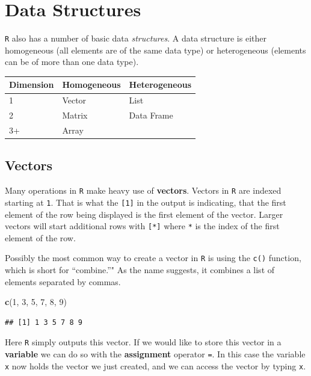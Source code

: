 \documentclass[]{book}
\newenvironment{Shaded}{\begin{snugshade}}{\end{snugshade}}
\newcommand{\KeywordTok}[1]{\textcolor[rgb]{0.13,0.29,0.53}{\textbf{#1}}}
\newcommand{\DecValTok}[1]{\textcolor[rgb]{0.00,0.00,0.81}{#1}}
\newcommand{\NormalTok}[1]{#1}
\theoremstyle{definition}
\theoremstyle{definition}
\theoremstyle{definition}
\theoremstyle{remark}
\begin{document}
\section{Data Structures}\label{data-structures}

\texttt{R} also has a number of basic data \emph{structures}. A data
structure is either homogeneous (all elements are of the same data type)
or heterogeneous (elements can be of more than one data type).

\begin{longtable}[]{@{}lll@{}}
\toprule
Dimension & \textbf{Homogeneous} & \textbf{Heterogeneous}\tabularnewline
\midrule
\endhead
1 & Vector & List\tabularnewline
2 & Matrix & Data Frame\tabularnewline
3+ & Array &\tabularnewline
\bottomrule
\end{longtable}

\subsection{Vectors}\label{vectors}

Many operations in \texttt{R} make heavy use of \textbf{vectors}.
Vectors in \texttt{R} are indexed starting at \texttt{1}. That is what
the \texttt{{[}1{]}} in the output is indicating, that the first element
of the row being displayed is the first element of the vector. Larger
vectors will start additional rows with \texttt{{[}*{]}} where
\texttt{*} is the index of the first element of the row.

Possibly the most common way to create a vector in \texttt{R} is using
the \texttt{c()} function, which is short for ``combine.''" As the name
suggests, it combines a list of elements separated by commas.

\begin{Shaded}
\begin{Highlighting}[]
\KeywordTok{c}\NormalTok{(}\DecValTok{1}\NormalTok{, }\DecValTok{3}\NormalTok{, }\DecValTok{5}\NormalTok{, }\DecValTok{7}\NormalTok{, }\DecValTok{8}\NormalTok{, }\DecValTok{9}\NormalTok{)}
\end{Highlighting}
\end{Shaded}

\begin{verbatim}
## [1] 1 3 5 7 8 9
\end{verbatim}

Here \texttt{R} simply outputs this vector. If we would like to store
this vector in a \textbf{variable} we can do so with the
\textbf{assignment} operator \texttt{=}. In this case the variable
\texttt{x} now holds the vector we just created, and we can access the
vector by typing \texttt{x}.
\end{document}
